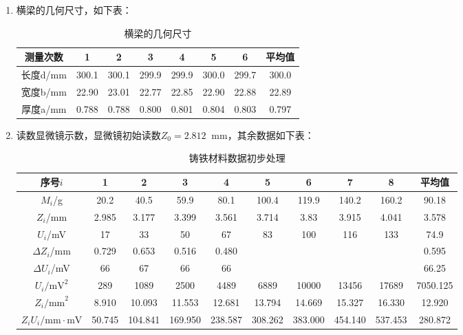 \documentclass[11pt]{article}
\newcommand*{\unit}[1]{\mathop{}\!\mathrm{#1}}
\begin{document}
\begin{enumerate}
    \item 横梁的几何尺寸，如下表：
    
    \begin{table}[H]
        \centering
        \begin{tabular}{|c|c|c|c|c|c|c|c|}
            \hline
            测量次数&1&2&3&4&5&6&平均值\\
            \hline
            长度d/mm&300.1  & 300.1  & 299.9  & 299.9  & 300.0  & 299.7  & 300.0   \\
            \hline
            宽度b/mm&22.90  & 23.01  & 22.77  & 22.85  & 22.90  & 22.88  & 22.89  \\
            \hline
            厚度a/mm&0.788  & 0.788  & 0.800  & 0.801  & 0.804  & 0.803  & 0.797  \\
            \hline
        \end{tabular}
        \caption{横梁的几何尺寸}
    \end{table}

    \item 读数显微镜示数，显微镜初始读数$Z_0 = 2.812 \unit{mm}$，其余数据如下表：
    
    \begin{table}[H]
        \centering
        \begin{tabular}{|c|c|c|c|c|c|c|c|c|c|}
            \hline
            序号$i$&1&2&3&4&5&6&7&8&平均值\\
            \hline
            $M_i$/g&20.2  & 40.5  & 59.9  & 80.1  & 100.4 & 119.9 & 140.2 & 160.2 & 90.18\\
            \hline
            $Z_i$/mm&2.985 & 3.177 & 3.399 & 3.561 & 3.714 & 3.83  & 3.915 & 4.041 & 3.578\\
            \hline
            $U_i$/mV&17    & 33    & 50    & 67    & 83    & 100   & 116   & 133   & 74.9  \\
            \hline
            $\Delta Z_i$/mm&0.729  & 0.653  & 0.516  & 0.480  &       &       &       &       & 0.595  \\
            \hline
            $\Delta U_i$/mV&66    & 67    & 66    & 66    &       &       &       &       & 66.25 \\
            \hline
            $U_i \text{/mV}^2$&289   & 1089  & 2500  & 4489  & 6889  & 10000 & 13456 & 17689 & 7050.125\\
            \hline
            $Z_i \text{/mm}^2$&8.910  & 10.093  & 11.553  & 12.681  & 13.794  & 14.669  & 15.327  & 16.330  & 12.920\\
            \hline
            $Z_i U_i \text{/mm} \cdot \text{mV}$&50.745  & 104.841  & 169.950  & 238.587  & 308.262  & 383.000  & 454.140  & 537.453  & 280.872\\
            \hline
        \end{tabular}
        \caption{铸铁材料数据初步处理}
    \end{table}
\end{enumerate}
\end{document}
